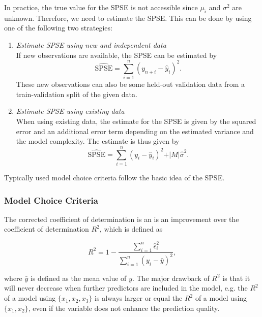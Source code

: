 
In practice, the true value for the SPSE is not accessible since $\mu_i$ and $\sigma^2$ are unknown. Therefore, we need to estimate the SPSE. This can be done by using one of the following two strategies:

\begin{enumerate}

	\item \emph{Estimate SPSE using new and independent data} \\	
	If new observations are available, the SPSE can be estimated by
	$$\widehat{\text{SPSE}} = \sum_{i=1}^n (y_{n+i} - \hat y_i)^2.$$
	These new observations can also be some held-out validation data from a train-validation split of the given data. 
	
	\item \emph{Estimate SPSE using existing data} \\
	When using existing data, the estimate for the SPSE is given by the squared error and an additional error term depending on the estimated variance and the model complexity. The estimate is thus given by
	$$\widehat{\text{SPSE}} = \sum_{i=1}^n(y_i - \hat y_i)^2 + \vert M \vert \hat \sigma^2.$$
\end{enumerate}

Typically used model choice criteria follow the basic idea of the SPSE.

\subsubsection{Model Choice Criteria}


The corrected coefficient of determination is an is an improvement over the coefficient of determination $R^2$, which is defined as 

$$R^2 = 1 - \frac{\sum_{i=1}^n \hat \epsilon_i^2}{\sum_{i=1}^n (y_i - \bar y)^2},$$

where $\bar y$ is defined as the mean value of $y$. The major drawback of $R^2$ is that it will never decrease when further predictors are included in the model, e.g. the $R^2$ of a model using $\{x_1, x_2, x_3\}$ is always larger or equal the $R^2$ of a model using $\{x_1, x_2\}$, even if the variable does not enhance the prediction quality. 

